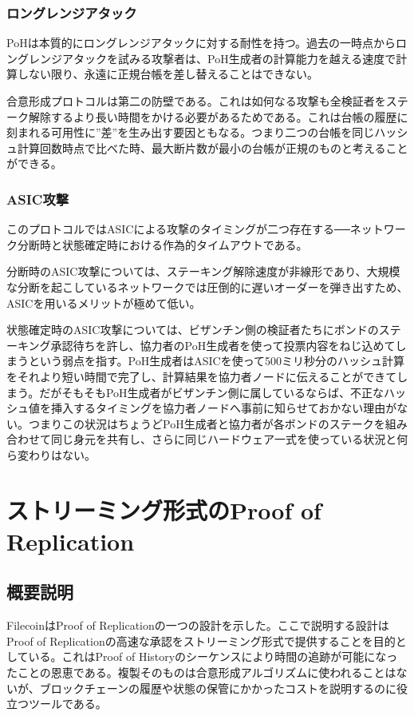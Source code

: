 \documentclass[12pt]{ltjsarticle}
\begin{document}
\subsubsection{ロングレンジアタック}\label{censorship}
PoHは本質的にロングレンジアタックに対する耐性を持つ。過去の一時点からロングレンジアタックを試みる攻撃者は、PoH生成者の計算能力を越える速度で計算しない限り、永遠に正規台帳を差し替えることはできない。

合意形成プロトコルは第二の防壁である。これは如何なる攻撃も全検証者をステーク解除するより長い時間をかける必要があるためである。これは台帳の履歴に刻まれる可用性に”差”を生み出す要因ともなる。つまり二つの台帳を同じハッシュ計算回数時点で比べた時、最大断片数が最小の台帳が正規のものと考えることができる。

\subsubsection{ASIC攻撃}\label{censorship}

このプロトコルではASICによる攻撃のタイミングが二つ存在する──ネットワーク分断時と状態確定時における作為的タイムアウトである。

分断時のASIC攻撃については、ステーキング解除速度が非線形であり、大規模な分断を起こしているネットワークでは圧倒的に遅いオーダーを弾き出すため、ASICを用いるメリットが極めて低い。

状態確定時のASIC攻撃については、ビザンチン側の検証者たちにボンドのステーキング承認待ちを許し、協力者のPoH生成者を使って投票内容をねじ込めてしまうという弱点を指す。PoH生成者はASICを使って500ミリ秒分のハッシュ計算をそれより短い時間で完了し、計算結果を協力者ノードに伝えることができてしまう。だがそもそもPoH生成者がビザンチン側に属しているならば、不正なハッシュ値を挿入するタイミングを協力者ノードへ事前に知らせておかない理由がない。つまりこの状況はちょうどPoH生成者と協力者が各ボンドのステークを組み合わせて同じ身元を共有し、さらに同じハードウェア一式を使っている状況と何ら変わりはない。

\section{ストリーミング形式のProof of Replication}\label{porep}
\subsection{概要説明}
FilecoinはProof of Replicationの一つの設計を示した\cite{filecoinporep}。ここで説明する設計はProof of Replicationの高速な承認をストリーミング形式で提供することを目的としている。これはProof of Historyのシーケンスにより時間の追跡が可能になったことの恩恵である。複製そのものは合意形成アルゴリズムに使われることはないが、ブロックチェーンの履歴や状態の保管にかかったコストを説明するのに役立つツールである。
\end{document}
